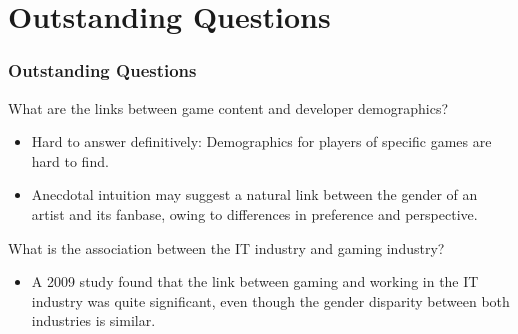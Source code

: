 \documentclass{beamer}
\begin{document}
\section{Outstanding Questions}
\begin{frame}
    \frametitle{Outstanding Questions}
    \item What are the links between game content and developer demographics?
    \begin{itemize}
        \item Hard to answer definitively: Demographics for players of specific games are hard to find.
        \item Anecdotal intuition may suggest a natural link between the gender of an artist and its fanbase, owing to differences in preference and perspective.
    \end{itemize}
    \item What is the association between the IT industry and gaming industry?
    \begin{itemize}
        \item A 2009 study \cite{betsy_questioning_2009} found that the link between gaming and working in the IT industry was quite significant, even though the gender disparity between both industries is similar.
    \end{itemize}
\end{frame}

\nocite{*}
%
%
\end{document}
